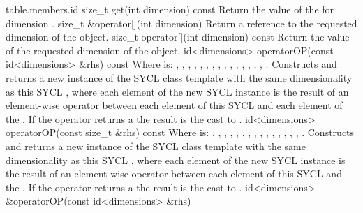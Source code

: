 {table.members.id}
  \addRow
    {size_t get(int dimension) const}
    {
        Return the value of the  for dimension
        .
    }
  \addRow
    {size_t \&operator[](int dimension)}
    {
        Return a reference to the requested dimension of the 
        object.
    }
  \addRow
    {size_t operator[](int dimension) const}
    {
        Return the value of the requested dimension of the 
        object.
    }
  \addRow
    { id<dimensions> operatorOP(const id<dimensions> \&rhs) const }
    {
      Where  is: \codeinline{+}, \codeinline{-}, \codeinline{*},
      \codeinline{/}, \codeinline{\%}, \codeinline{<<}, \codeinline{>>},
      \codeinline{\&}, \codeinline{|}, \codeinline{^}, \codeinline{\&\&},
      \codeinline{||}, \codeinline{<}, \codeinline{>}, \codeinline{<=},
      \codeinline{>=}.
      \newline
      Constructs and returns a new instance of the SYCL  class
      template with the same dimensionality as this SYCL , where
      each element of the new SYCL  instance is the result of an
      element-wise  operator between each element of this SYCL
       and each element of the  .
      If the operator returns a  the result is the cast to
      .
    }
  \addRow
    { id<dimensions> operatorOP(const size_t \&rhs) const }
    {
      Where  is: \codeinline{+}, \codeinline{-}, \codeinline{*},
      \codeinline{/}, \codeinline{\%}, \codeinline{<<}, \codeinline{>>},
      \codeinline{\&}, \codeinline{|}, \codeinline{^}, \codeinline{\&\&},
      \codeinline{||}, \codeinline{<}, \codeinline{>}, \codeinline{<=},
      \codeinline{>=}.
      \newline
      Constructs and returns a new instance of the SYCL  class
      template with the same dimensionality as this SYCL , where
      each element of the new SYCL  instance is the result of an
      element-wise  operator between each element of this SYCL
       and the  . If the
      operator returns a  the result is the cast to
      .
    }
  \addRow
    { id<dimensions> \&operatorOP(const id<dimensions> \&rhs) }
